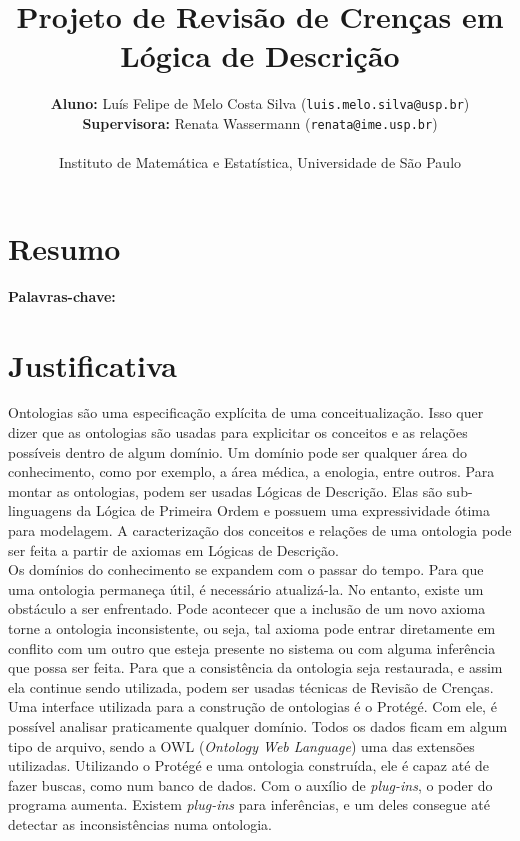 \documentclass[12pt,letterpaper]{article}
\begin{document}
	
	\title{Projeto de Revisão de Crenças em Lógica de Descrição}
	\author{\textbf{Aluno:} Luís Felipe de Melo Costa Silva (\texttt{luis.melo.silva@usp.br})\\ 
		\textbf{Supervisora:} Renata Wassermann (\texttt{renata@ime.usp.br})\\ \\
		Instituto de Matemática e Estatística, Universidade de São Paulo}
	
	\maketitle
	
	\section{Resumo}
	
	\textbf{Palavras-chave:}
	
	\clearpage
	
	\section{Justificativa} 
	
	Ontologias são uma especificação explícita de uma conceitualização. Isso quer dizer que as ontologias são usadas para explicitar os conceitos e as relações possíveis dentro de algum domínio. Um domínio pode ser qualquer área do conhecimento, como por exemplo, a área médica, a enologia, entre outros. Para montar as ontologias, podem ser usadas Lógicas de Descrição. Elas são sub-linguagens da Lógica de Primeira Ordem e possuem uma expressividade ótima para modelagem. A caracterização dos conceitos e relações de uma ontologia pode ser feita a partir de axiomas em Lógicas de Descrição. \\
	
	Os domínios do conhecimento se expandem com o passar do tempo. Para que uma ontologia permaneça útil, é necessário atualizá-la. No entanto, existe um obstáculo a ser enfrentado. Pode acontecer que a inclusão de um novo axioma torne a ontologia inconsistente, ou seja, tal axioma pode entrar diretamente em conflito com um outro que esteja presente no sistema ou com alguma inferência que possa ser feita. Para que a consistência da ontologia seja restaurada, e assim ela continue sendo utilizada, podem ser usadas técnicas de Revisão de Crenças. \\
	
	Uma interface utilizada para a construção de ontologias é o Protégé. Com ele, é possível analisar praticamente qualquer domínio. Todos os dados ficam em algum tipo de arquivo, sendo a OWL (\textit{Ontology Web Language}) uma das extensões utilizadas. Utilizando o Protégé e uma ontologia construída, ele é capaz até de fazer buscas, como num banco de dados. Com o auxílio de \textit{plug-ins}, o poder do programa aumenta. Existem \textit{plug-ins} para inferências, e um deles consegue até detectar as inconsistências numa ontologia. \\
	
\end{document}
